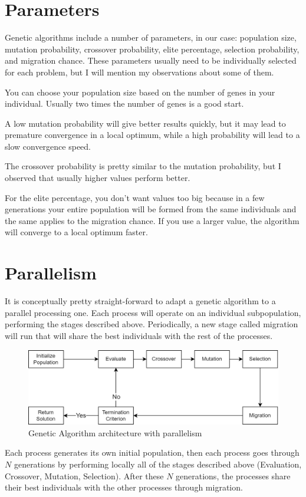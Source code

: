 \section{Parameters}
Genetic algorithms include a number of parameters, in our case: population size, mutation probability, crossover probability, elite percentage, selection probability, and migration chance. These parameters usually need to be individually selected for each problem, but I will mention my observations about some of them.
\par
You can choose your population size based on the number of genes in your individual. Usually two times the number of genes is a good start.
\par
A low mutation probability will give better results quickly, but it may lead to premature convergence in a local optimum, while a high probability will lead to a slow convergence speed.
\par
The crossover probability is pretty similar to the mutation probability, but I observed that usually higher values perform better.
\par
For the elite percentage, you don't want values too big because in a few generations your entire population will be formed from the same individuals and the same applies to the migration chance. If you use a larger value, the algorithm will converge to a local optimum faster.
\newpage
\section{Parallelism}
It is conceptually pretty straight-forward to adapt a genetic algorithm to a parallel processing one. Each process will operate on an individual subpopulation, performing the stages described above. Periodically, a new stage called migration will run that will share the best individuals with the rest of the processes.
\begin{figure}[ht]
\includegraphics[width=\textwidth]{images/ga_2.png}
\caption{Genetic Algorithm architecture with parallelism}
\end{figure}
\par
Each process generates its own initial population, then each process goes through $N$ generations by performing locally all of the stages described above (Evaluation, Crossover, Mutation, Selection). After these $N$ generations, the processes share their best individuals with the other processes through migration.
